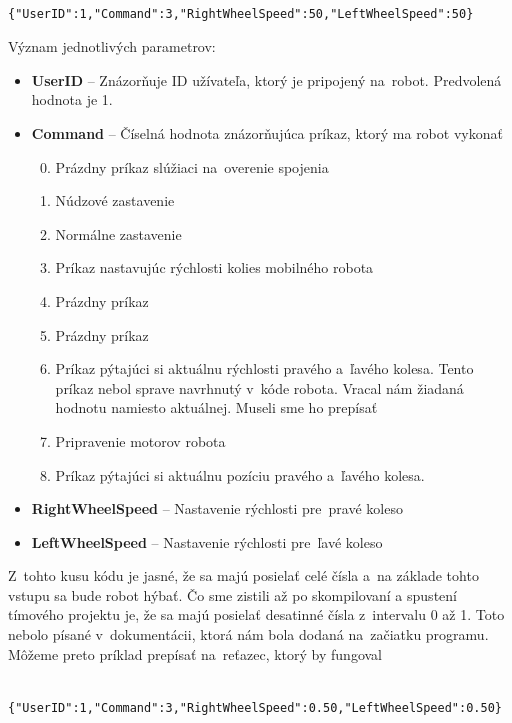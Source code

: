 \label{jsonSpeedRequestBad}
\begin{lstlisting}
		{"UserID":1,"Command":3,"RightWheelSpeed":50,"LeftWheelSpeed":50}
\end{lstlisting}

\newpage

\noindent Význam jednotlivých parametrov:
\begin{itemize}
	\item \textbf{UserID} -- Znázorňuje ID užívateľa, ktorý je pripojený na~robot. Predvolená hodnota je 1.
	\item \textbf{Command} --  Číselná hodnota znázorňujúca príkaz, ktorý ma robot vykonať
		\begin{enumerate}
			\setcounter{enumi}{-1}
			\item \label{c0} Prázdny príkaz slúžiaci na~overenie spojenia
			\item \label{c1} Núdzové zastavenie
			\item \label{c2} Normálne zastavenie
			\item \label{c3} Príkaz nastavujúc rýchlosti kolies mobilného robota
			\item \label{c4} Prázdny príkaz
			\item \label{c5} Prázdny príkaz
			\item \label{c6} Príkaz pýtajúci si aktuálnu rýchlosti pravého a~ľavého kolesa. Tento príkaz nebol sprave navrhnutý v~kóde robota. Vracal nám žiadaná hodnotu
				namiesto aktuálnej. Museli sme ho prepísať
			\item \label{c7} Pripravenie motorov robota
			\item \label{c8} Príkaz pýtajúci si aktuálnu pozíciu pravého a~ľavého kolesa.
		\end{enumerate}
	\item \textbf{RightWheelSpeed} -- Nastavenie rýchlosti pre~pravé koleso
	\item \textbf{LeftWheelSpeed} -- Nastavenie rýchlosti pre~ľavé koleso
\end{itemize}

\noindent Z~tohto kusu kódu je jasné, že sa majú posielať celé čísla a~na základe tohto vstupu sa bude robot hýbať. Čo sme zistili až po skompilovaní
a spustení tímového projektu je, že sa majú posielať desatinné čísla z~intervalu 0 až 1. Toto nebolo písané v~dokumentácii, ktorá nám bola dodaná na~začiatku
programu. Môžeme preto príklad prepísať na~reťazec, ktorý by fungoval

\label{jsonSpeedRequestGood}
\begin{lstlisting}
		{"UserID":1,"Command":3,"RightWheelSpeed":0.50,"LeftWheelSpeed":0.50}
\end{lstlisting}


